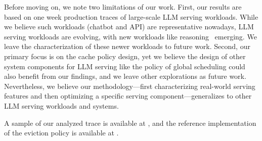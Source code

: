 Before moving on, we note two limitations of our work.
First, our results are based on one week production traces of large-scale LLM serving workloads.
While we believe such workloads (chatbot and API) are representative nowadays,
LLM serving workloads are evolving, with new workloads like reasoning~\cite{openai-o1} emerging.
We leave the characterization of these newer workloads to future work.
Second, our primary focus is on the {\kvcache} cache policy design,
yet we believe the design of other system components for LLM serving 
like the policy of global scheduling 
could also benefit from our findings,
and we leave other explorations as future work.
Nevertheless, we believe our methodology---first characterizing real-world serving features
and then optimizing a specific serving component---generalizes to other LLM serving workloads and systems.

A sample of our analyzed trace is available at ,
and the reference implementation of the eviction policy is available at
. 